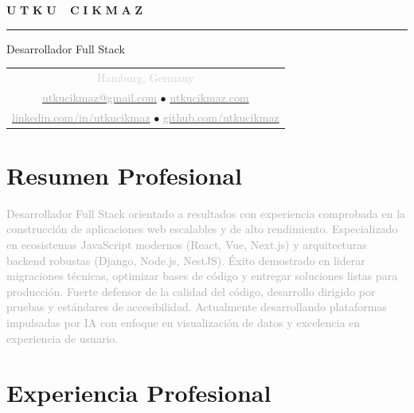 \documentclass[10pt,a4paper]{article}
\newcommand{\gradientname}[1]{%
  \textcolor{darkgray!90}{\Huge\bfseries U}%
  \textcolor{darkgray!80}{\Huge\bfseries T}%
  \textcolor{darkgray!70}{\Huge\bfseries K}%
  \textcolor{darkgray!60}{\Huge\bfseries U}%
  \textcolor{mediumgray!90}{\Huge\bfseries\ }%
  \textcolor{mediumgray!80}{\Huge\bfseries C}%
  \textcolor{mediumgray!70}{\Huge\bfseries I}%
  \textcolor{mediumgray!60}{\Huge\bfseries K}%
  \textcolor{mediumgray!50}{\Huge\bfseries M}%
  \textcolor{lightgray!80}{\Huge\bfseries A}%
  \textcolor{lightgray!70}{\Huge\bfseries Z}%
}
\begin{document}
\color{black}
\pagestyle{empty}

\begin{center}
  \vspace{-3pt}
  \gradientname{UTKU CIKMAZ}
  
  \vspace{4pt}
  \textcolor{verylightgray}{\rule{0.35\textwidth}{0.6pt}}
  
  \vspace{4pt}
  {\large\color{mediumgray}Desarrollador Full Stack}
  
  \vspace{5pt}
  \begin{tabular}{c}
    \textcolor{lightgray}{\small Hamburg, Germany} \\[2pt]
    \href{mailto:utkucikmaz@gmail.com}{\textcolor{darkgray}{utkucikmaz@gmail.com}} \quad
    \textcolor{verylightgray}{$\bullet$} \quad
    \href{https://www.utkucikmaz.com}{\textcolor{darkgray}{utkucikmaz.com}} \\[1pt]
    \href{https://linkedin.com/in/utkucikmaz}{\textcolor{darkgray}{linkedin.com/in/utkucikmaz}} \quad
    \textcolor{verylightgray}{$\bullet$} \quad
    \href{https://github.com/utkucikmaz}{\textcolor{darkgray}{github.com/utkucikmaz}}
  \end{tabular}
\end{center}

\vspace{1pt}

\section*{Resumen Profesional}
\vspace{0pt}
\textcolor{darkgray}{%
Desarrollador Full Stack orientado a resultados con experiencia comprobada en la construcción de aplicaciones web escalables y de alto rendimiento. Especializado en ecosistemas JavaScript modernos (React, Vue, Next.js) y arquitecturas backend robustas (Django, Node.js, NestJS). Éxito demostrado en liderar migraciones técnicas, optimizar bases de código y entregar soluciones listas para producción. Fuerte defensor de la calidad del código, desarrollo dirigido por pruebas y estándares de accesibilidad. Actualmente desarrollando plataformas impulsadas por IA con enfoque en visualización de datos y excelencia en experiencia de usuario.
}
\vspace{1pt}

\section*{Experiencia Profesional}
\end{document}
